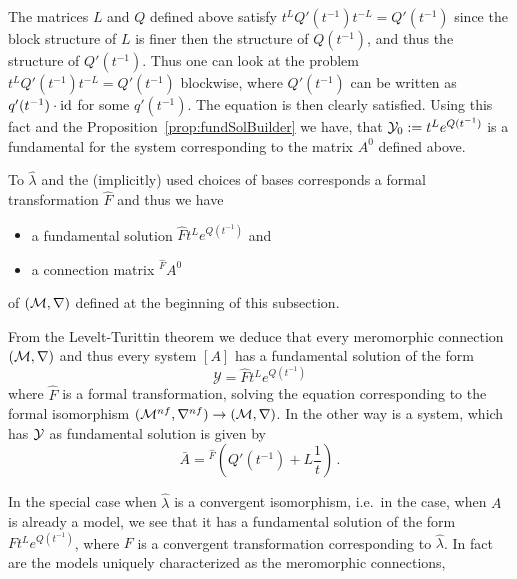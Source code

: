 The matrices $L$ and $Q$ defined above satisfy $t^LQ'(t^{-1})t^{-L}=Q'(t^{-1})$
since the block structure of $L$ is finer then the structure of $Q(t^{-1})$,
and thus the structure of $Q'(t^{-1})$. Thus one can look at the problem
$t^LQ'(t^{-1})t^{-L}=Q'(t^{-1})$ blockwise, where $Q'(t^{-1})$ can be written
as $q'(t^{-1})\cdot\operatorname{id}$ for some $q'(t^{-1})$. The equation is then clearly
satisfied.
Using this fact and the Proposition~\ref{prop:fundSolBuilder} we have, that
$\mathcal{Y}_0:=t^Le^{Q(t^{-1})}$ is a fundamental for the system corresponding to the
matrix $A^0$ defined above.

To $\hat\lambda$ and the (implicitly) used choices of bases corresponds a
formal transformation $\hat F$ and thus we have
\begin{itemize}
  \item a fundamental solution $\hat Ft^L e^{Q(t^{-1})}$ and
  \item a connection matrix ${}^{\hat F}\!A^0$
\end{itemize}
of $(\mathcal{M},\nabla)$ defined at the beginning of this subsection.
\begin{cor}
  From the Levelt-Turittin theorem we deduce that every meromorphic connection
  $(\mathcal{M},\nabla)$ and thus every system $[A]$ has a fundamental solution of the
  form
  \[
    \mathcal{Y}=\hat F t^L e^{Q(t^{-1})}
  \]
  where $\hat F$ is a formal transformation, solving the equation corresponding
  to the formal isomorphism $(\mathcal{M}^{nf},\nabla^{nf})\to(\mathcal{M},\nabla)$.
  In the other way is a system, which has $\mathcal{Y}$ as fundamental solution is
  given by
  \[
    \bar A={}^{\hat F}\!\left(Q'(t^{-1})+L\frac{1}{t}\right) \,.
  \]
  \begin{comment}
    \begin{s-rem}
      It is always possible to permutate the columns of a fundamental solution
      by
      \[
        P^{-1}\mathcal{Y}P=\hat F t^{P^{-1}LP} e^{P^{-1}Q(t^{-1})P}
      \]
      with a permutation matrix $P$ and \rewrite{obtain another fundamental
      solution for the same system} (cf.\ \cite[73]{Loday2014}).
    \end{s-rem}
  \end{comment}
\end{cor}
In the special case when $\hat\lambda$ is a convergent isomorphism, i.e.\ in
the case, when $A$ is already a model, we see that it has a fundamental
solution of the form $Ft^L e^{Q(t^{-1})}$, where $F$ is a convergent
transformation corresponding to $\hat\lambda$.
In fact are the models uniquely characterized as the meromorphic connections,
